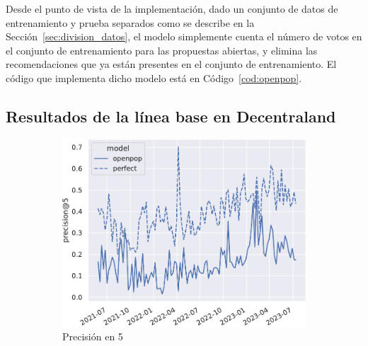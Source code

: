 Desde el punto de vista de la implementación, dado un conjunto de datos de entrenamiento y prueba separados como se describe en la Sección~\ref{sec:division_datos}, el modelo simplemente cuenta el número de votos en el conjunto de entrenamiento para las propuestas abiertas, y elimina las recomendaciones que ya están presentes en el conjunto de entrenamiento. El código que implementa dicho modelo está en Código~\ref{cod:openpop}.

\subsection{Resultados de la línea base en Decentraland}

\begin{figure}[tb]
    \centering
    \begin{subfigure}{.48\textwidth}
        \centering
        \includegraphics[width=\linewidth]{figures/04_validacion/10_all_precision@5_W-THU_True_Decentraland.pdf}
        \caption{Precisión en 5}
        \label{fig:openpop_precision@5}
    \end{subfigure}\hfill\begin{subfigure}{.48\textwidth}
        \centering

\end{subfigure}
\end{figure}
